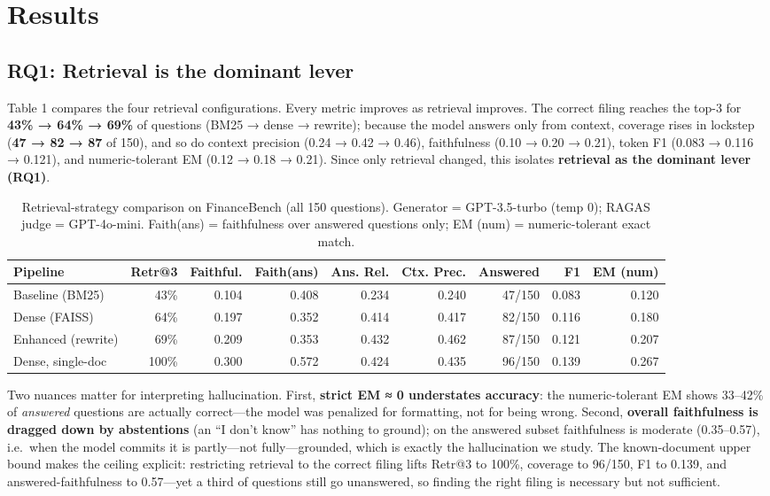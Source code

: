 \documentclass[11pt]{article}
\begin{document}
\hypertarget{results}{%
\section{Results}\label{results}}

\hypertarget{rq1-retrieval-is-the-dominant-lever}{%
\subsection{RQ1: Retrieval is the dominant
lever}\label{rq1-retrieval-is-the-dominant-lever}}

Table 1 compares the four retrieval configurations. Every metric
improves as retrieval improves. The correct filing reaches the top-3 for
\textbf{43\% → 64\% → 69\%} of questions (BM25 → dense → rewrite);
because the model answers only from context, coverage rises in lockstep
(\textbf{47 → 82 → 87} of 150), and so do context precision (0.24 → 0.42
→ 0.46), faithfulness (0.10 → 0.20 → 0.21), token F1 (0.083 → 0.116 →
0.121), and numeric-tolerant EM (0.12 → 0.18 → 0.21). Since only
retrieval changed, this isolates \textbf{retrieval as the dominant lever
(RQ1)}.

\begin{table}[t]\centering\small
\begin{tabular}{lrrrrrrrr}
\toprule
Pipeline & Retr@3 & Faithful. & Faith(ans) & Ans. Rel. & Ctx. Prec. & Answered & F1 & EM (num) \\
\midrule
Baseline (BM25) & 43\% & 0.104 & 0.408 & 0.234 & 0.240 & 47/150 & 0.083 & 0.120 \\
Dense (FAISS) & 64\% & 0.197 & 0.352 & 0.414 & 0.417 & 82/150 & 0.116 & 0.180 \\
Enhanced (rewrite) & 69\% & 0.209 & 0.353 & 0.432 & 0.462 & 87/150 & 0.121 & 0.207 \\
Dense, single-doc & 100\% & 0.300 & 0.572 & 0.424 & 0.435 & 96/150 & 0.139 & 0.267 \\
\bottomrule
\end{tabular}
\caption{Retrieval-strategy comparison on FinanceBench (all 150 questions). Generator = GPT-3.5-turbo (temp 0); RAGAS judge = GPT-4o-mini. Faith(ans) = faithfulness over answered questions only; EM (num) = numeric-tolerant exact match.}
\label{tab:retrieval}
\end{table}

Two nuances matter for interpreting hallucination. First, \textbf{strict
EM ≈ 0 understates accuracy}: the numeric-tolerant EM shows 33--42\% of
\emph{answered} questions are actually correct---the model was penalized
for formatting, not for being wrong. Second, \textbf{overall
faithfulness is dragged down by abstentions} (an ``I don't know'' has
nothing to ground); on the answered subset faithfulness is moderate
(0.35--0.57), i.e.~when the model commits it is partly---not
fully---grounded, which is exactly the hallucination we study. The
known-document upper bound makes the ceiling explicit: restricting
retrieval to the correct filing lifts Retr@3 to 100\%, coverage to
96/150, F1 to 0.139, and answered-faithfulness to 0.57---yet a third of
questions still go unanswered, so finding the right filing is necessary
but not sufficient.
\end{document}

